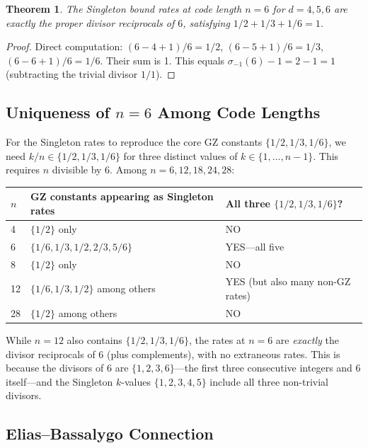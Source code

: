\documentclass[11pt,a4paper]{article}
\newtheorem{theorem}{Theorem}
\begin{document}
\begin{theorem}
The Singleton bound rates at code length $n = 6$ for $d = 4, 5, 6$ are exactly the proper divisor reciprocals of $6$, satisfying $1/2 + 1/3 + 1/6 = 1$.
\end{theorem}

\begin{proof}
Direct computation: $(6 - 4 + 1)/6 = 1/2$, $(6 - 5 + 1)/6 = 1/3$, $(6 - 6 + 1)/6 = 1/6$. Their sum is 1. This equals $\sigma_{-1}(6) - 1 = 2 - 1 = 1$ (subtracting the trivial divisor $1/1$).
\end{proof}

\subsection{Uniqueness of $n = 6$ Among Code Lengths}

For the Singleton rates to reproduce the core GZ constants $\{1/2, 1/3, 1/6\}$, we need $k/n \in \{1/2, 1/3, 1/6\}$ for three distinct values of $k \in \{1, \ldots, n-1\}$. This requires $n$ divisible by 6. Among $n = 6, 12, 18, 24, 28$:

\begin{center}
\begin{tabular}{lll}
\toprule
$n$ & GZ constants appearing as Singleton rates & All three $\{1/2, 1/3, 1/6\}$? \\
\midrule
4  & $\{1/2\}$ only & NO \\
6  & $\{1/6, 1/3, 1/2, 2/3, 5/6\}$ & YES---all five \\
8  & $\{1/2\}$ only & NO \\
12 & $\{1/6, 1/3, 1/2\}$ among others & YES (but also many non-GZ rates) \\
28 & $\{1/2\}$ among others & NO \\
\bottomrule
\end{tabular}
\end{center}

While $n = 12$ also contains $\{1/2, 1/3, 1/6\}$, the rates at $n = 6$ are \emph{exactly} the divisor reciprocals of 6 (plus complements), with no extraneous rates. This is because the divisors of 6 are $\{1, 2, 3, 6\}$---the first three consecutive integers and 6 itself---and the Singleton $k$-values $\{1, 2, 3, 4, 5\}$ include all three non-trivial divisors.

\subsection{Elias--Bassalygo Connection}
\end{document}
